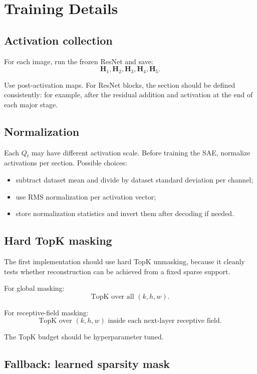 \documentclass[11pt]{article}
\newcommand{\Htens}{\mathbf{H}}
\begin{document}
\section{Training Details}

\subsection{Activation collection}

For each image, run the frozen ResNet and save:
\[
\Htens_1,\Htens_2,\Htens_3,\Htens_4,\Htens_5.
\]

Use post-activation maps. For ResNet blocks, the section should be defined consistently: for example, after the residual addition and activation at the end of each major stage.

\subsection{Normalization}

Each \(Q_t\) may have different activation scale. Before training the SAE, normalize activations per section. Possible choices:

\begin{itemize}[leftmargin=*]
    \item subtract dataset mean and divide by dataset standard deviation per channel;
    \item use RMS normalization per activation vector;
    \item store normalization statistics and invert them after decoding if needed.
\end{itemize}

\subsection{Hard TopK masking}

The first implementation should use hard TopK unmasking, because it cleanly tests whether reconstruction can be achieved from a fixed sparse support.

For global masking:
\[
\text{TopK over all } (k,h,w).
\]

For receptive-field masking:
\[
\text{TopK over } (k,h,w) \text{ inside each next-layer receptive field.}
\]

The TopK budget should be hyperparameter tuned.

\subsection{Fallback: learned sparsity mask}
\end{document}
